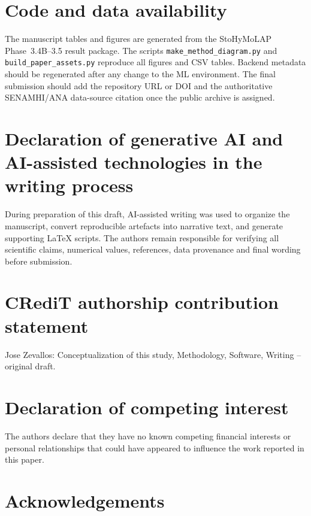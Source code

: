 \documentclass[a4paper,fleqn]{cas-sc}
\begin{document}
\section*{Code and data availability}

The manuscript tables and figures are generated from the StoHyMoLAP
Phase~3.4B--3.5 result package. The scripts
\texttt{make\_method\_diagram.py} and \texttt{build\_paper\_assets.py}
reproduce all figures and CSV tables. Backend metadata should be
regenerated after any change to the ML environment. The final
submission should add the repository URL or DOI and the authoritative
SENAMHI/ANA data-source citation once the public archive is assigned.

\section*{Declaration of generative AI and AI-assisted technologies
in the writing process}

During preparation of this draft, AI-assisted writing was used to
organize the manuscript, convert reproducible artefacts into narrative
text, and generate supporting LaTeX scripts. The authors remain
responsible for verifying all scientific claims, numerical values,
references, data provenance and final wording before submission.

\section*{CRediT authorship contribution statement}

Jose Zevallos: Conceptualization of this study, Methodology, Software,
Writing -- original draft.

\section*{Declaration of competing interest}

The authors declare that they have no known competing financial
interests or personal relationships that could have appeared to
influence the work reported in this paper.

\section*{Acknowledgements}

\printcredits




\end{document}

